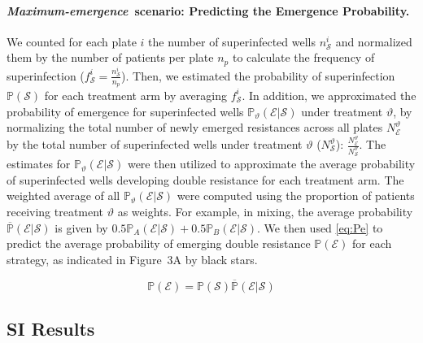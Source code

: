 \paragraph{\textit{Maximum-emergence}~scenario: Predicting the Emergence Probability.}
We counted for each plate $i$ the number of superinfected wells $n_\mathcal{S}^i$ and normalized them by the number of patients per plate $n_p$ to calculate the frequency of superinfection (\(f_\mathcal{S}^i = \frac{n^i_\mathcal{S}}{n_p}\)).
Then, we estimated the probability of superinfection \(\mathbb{P}(\mathcal{S})\) for each treatment arm by averaging \(f_\mathcal{S}^i\). 
In addition, we approximated the probability of emergence for superinfected wells  \(\mathbb{P}_\vartheta(\mathcal E|\mathcal S)\) under treatment \(\vartheta\), by normalizing the total number of newly emerged resistances across all plates $N^\vartheta_\mathcal{E}$ by the total number of superinfected wells under treatment \(\vartheta\) ($N^\vartheta_\mathcal{S}$): \(\frac{N^\vartheta_\mathcal{E}}{N^\vartheta_\mathcal{S}}\).
The estimates for \(\mathbb{P}_\vartheta(\mathcal E|\mathcal S)\) were then utilized to approximate the average probability of superinfected wells developing double resistance for each treatment arm.
The weighted average of all \(\mathbb{P}_\vartheta(\mathcal E|\mathcal S)\) were computed using the proportion of patients receiving treatment \(\vartheta\) as weights.
For example, in mixing, the average probability \(\overline{\mathbb{P}}(\mathcal E|\mathcal S)\) is given by \(0.5 \mathbb{P}_A(\mathcal E|\mathcal S) + 0.5 \mathbb{P}_B(\mathcal E|\mathcal S)\).
We then used \autoref{eq:Pe} to predict the average probability of emerging double resistance \(\mathbb{P}(\mathcal E)\) for each strategy, as indicated in Figure~3A by black stars.

\begin{equation}
    \mathbb{P}(\mathcal E) = \mathbb{P}(\mathcal S)  \overline{\mathbb{P}}(\mathcal E|\mathcal S)
    \label{eq:Pe}
\end{equation}



\subsection{SI Results\label{ssec:si_results}}
